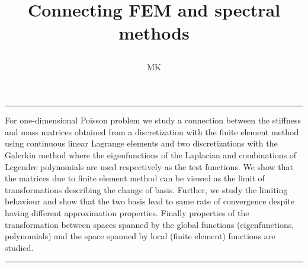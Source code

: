\documentclass[a4paper,10pt]{article}
\renewenvironment{abstract}{%
\hfill\begin{minipage}{0.95\textwidth}
\rule{\textwidth}{1pt}}
{\par\noindent\rule{\textwidth}{1pt}\end{minipage}}
\begin{document}
%
\title{\begin{center}
        Connecting FEM and spectral methods
       \end{center}}
\author[1]{MK}
%
\maketitle
%
\begin{abstract}
  For one-dimensional Poisson problem we study a connection between the
  stiffness and mass matrices obtained from a discretization with the finite
  element method using continuous linear Lagrange elements and two discretizations
  with the Galerkin method where the eigenfunctions of the Laplacian and
  combinations of Legendre polynomials are used respectively as the test
  functions. We show that the matrices due to finite element method can be
  viewed as the limit of transformations describing the change of basis. Further,
  we study the limiting behaviour and show that the two basis lead to same rate
  of convergence despite having different approximation properties.
  Finally properties of the transformation between spaces spanned by the
  global functions (eigenfunctions, polynomials) and the space spanned by 
  local (finite element) functions are studied.
\end{abstract}
\end{document}
